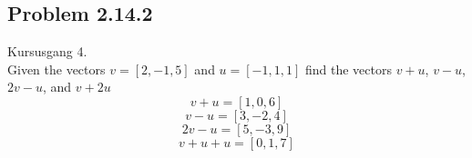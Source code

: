 \subsection{Problem 2.14.2}
Kursusgang 4.\\
Given the vectors $v=[2,-1,5]$ and $u=[-1,1,1]$ find the vectors $v+u$, $v-u$, $2v-u$, and $v+2u$
\begin{equation}
    v+u=[1,0,6]
\end{equation}
\begin{equation}
    v-u=[3,-2,4]
\end{equation}
\begin{equation}
    2v-u=[5,-3, 9]
\end{equation}
\begin{equation}
    v+u+u=[0,1,7]
\end{equation}

